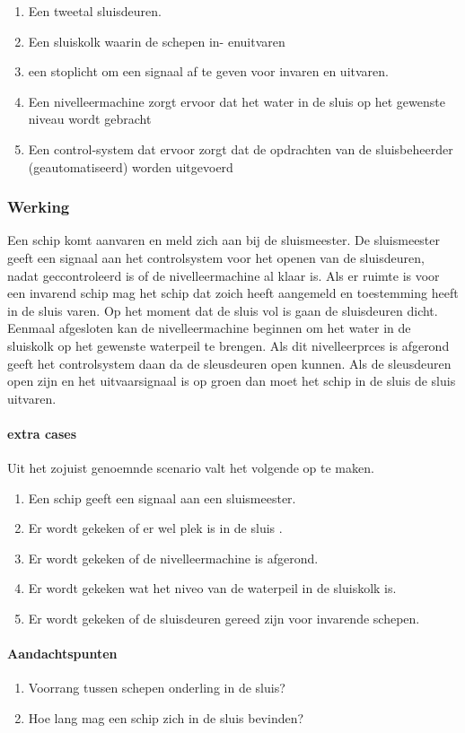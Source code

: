 \begin{enumerate}
	\item Een tweetal sluisdeuren. 
	\item Een sluiskolk waarin de schepen in- enuitvaren
	\item een stoplicht om een signaal af te geven voor invaren en uitvaren.
	\item Een nivelleermachine zorgt ervoor dat het water in de sluis op het gewenste niveau wordt gebracht
	\item Een control-system dat ervoor zorgt dat de opdrachten van de sluisbeheerder (geautomatiseerd) worden uitgevoerd
\end{enumerate}
\subsubsection{Werking}

Een schip komt aanvaren en meld zich aan bij de sluismeester. De sluismeester geeft een signaal aan het controlsystem voor het openen van de sluisdeuren, nadat geccontroleerd is of de nivelleermachine al klaar is. Als er ruimte is voor een invarend schip mag het schip dat zoich heeft aangemeld en toestemming heeft  in de sluis varen. Op het moment dat de sluis vol is gaan de sluisdeuren dicht. Eenmaal afgesloten kan de nivelleermachine beginnen om het water in de sluiskolk op het gewenste waterpeil te brengen. Als dit nivelleerprces is afgerond geeft  het controlsystem daan da de sleusdeuren open kunnen.  Als de sleusdeuren open zijn en het uitvaarsignaal is op groen dan moet het schip in de sluis de sluis uitvaren.
\paragraph{extra cases}
Uit het zojuist genoemnde scenario valt het volgende op te maken.
\begin{enumerate}
	\item Een schip geeft een signaal aan een sluismeester.
	\item Er wordt gekeken of er wel plek is in de sluis .
	\item Er wordt gekeken of de nivelleermachine is afgerond.
	\item Er wordt gekeken wat het niveo van de waterpeil in de sluiskolk is.
	\item Er wordt gekeken of de sluisdeuren gereed zijn voor invarende schepen.
\end{enumerate}
\paragraph{Aandachtspunten}
\begin{enumerate}
	\item Voorrang tussen schepen onderling in de sluis?
	\item Hoe lang mag een schip zich in de sluis bevinden?
\end{enumerate} 




